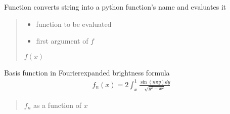 \documentclass[letterpaper,10pt,english]{sphinxmanual}
\begin{document}
\begin{fulllineitems}
\label{\detokenize{diffsph.utils:diffsph.utils.tools.evaluate}}
\pysigstartsignatures
{}
\pysigstopsignatures
\sphinxAtStartPar
Function converts string into a python function’s name and evaluates it
\begin{quote}\begin{description}
\begin{itemize}
\item {} 
\sphinxAtStartPar
{} \textendash{} function to be evaluated

\item {} 
\sphinxAtStartPar
{} \textendash{} first argument of \(f\)

\end{itemize}

\sphinxAtStartPar
\(f(x)\)

\end{description}\end{quote}

\end{fulllineitems}


\begin{fulllineitems}
\label{\detokenize{diffsph.utils:diffsph.utils.tools.f}}
\pysigstartsignatures
{}
\pysigstopsignatures
\sphinxAtStartPar
Basis function in Fourier\sphinxhyphen{}expanded brightness formula
\begin{equation*}
\begin{split}f_n(x)=2\int_x^1\frac{\sin(n\pi y) dy}{\sqrt{y^2-x^2}}\end{split}
\end{equation*}\begin{quote}\begin{description}
\sphinxAtStartPar
\(f_n\) as a function of \(x\)

\end{description}\end{quote}

\end{fulllineitems}
\end{document}
